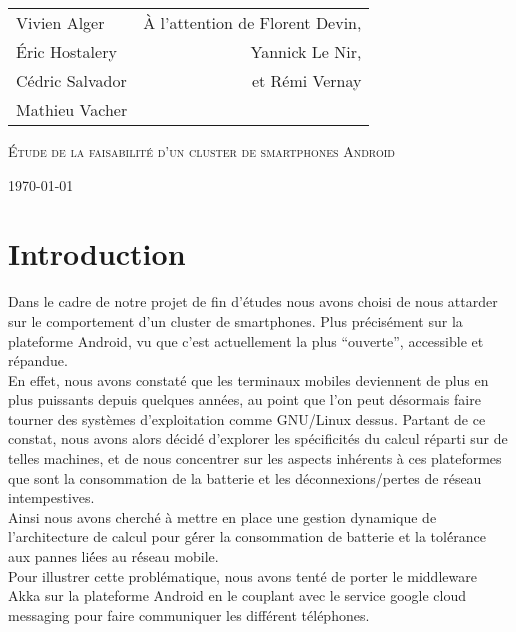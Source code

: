 \documentclass[a4paper,12pt]{report}
\begin{document}
\begin{titlepage}

\addtolength{\oddsidemargin}{-0.15in}
\addtolength{\textwidth}{0.5in}
\addtolength{\topmargin}{-.375in}
\addtolength{\textheight}{0.75in}

\begin{center}

\begin{tabular*}{6in}{l@{\extracolsep{\fill}}r}{Vivien Alger}&{À
    l'attention de Florent Devin,}\\
    {Éric Hostalery}&{Yannick Le Nir,}\\
    {Cédric Salvador}&{et Rémi Vernay}\\
    {Mathieu Vacher}
\end{tabular*}
\vspace*{\fill}

\textsc{\LARGE Étude de la faisabilité
d'un cluster de smartphones Android}\\
\vspace*{\fill}

\today
\end{center}

\end{titlepage}

\tableofcontents
\newpage
  
\section*{Introduction}
Dans le cadre de notre projet de fin d’études nous avons choisi de nous 
attarder sur le comportement d’un cluster de smartphones. Plus précisément
sur la plateforme Android, vu que c’est actuellement la plus “ouverte”, 
accessible et répandue.\\
En effet, nous avons constaté que les terminaux mobiles deviennent de plus en 
plus puissants depuis quelques années, au point que l’on peut désormais faire 
tourner des systèmes d’exploitation comme GNU/Linux dessus. Partant de ce 
constat, nous avons alors décidé d’explorer les spécificités du calcul réparti
sur de telles machines, et de nous concentrer sur les aspects inhérents à ces 
plateformes que sont la consommation de la batterie et les déconnexions/pertes
 de réseau intempestives.\\
Ainsi nous avons cherché à mettre en place une gestion dynamique de 
l’architecture de calcul pour gé́rer la consommation de batterie et la tolé́rance
aux pannes lié́es au ré́seau mobile.\\
Pour illustrer cette problématique, nous avons tenté de porter le middleware 
Akka sur la plateforme Android en le couplant avec le service google cloud 
messaging pour faire communiquer les différent téléphones.
\end{document}
